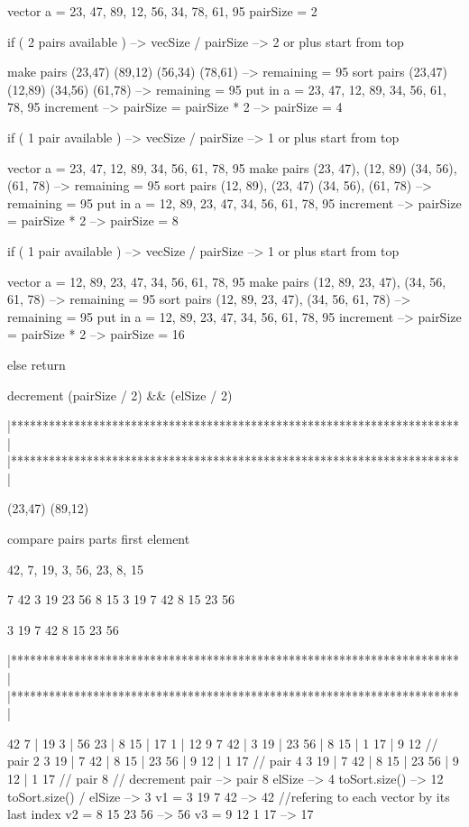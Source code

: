 vector a = {23, 47, 89, 12, 56, 34, 78, 61, 95}
pairSize = 2

if ( 2 pairs available ) --> vecSize / pairSize --> 2 or plus
    start from top

make pairs (23,47) (89,12) (56,34) (78,61) --> remaining = 95
sort pairs (23,47) (12,89) (34,56) (61,78) --> remaining = 95
put in a = {23, 47, 12, 89, 34, 56, 61, 78, 95}
increment --> pairSize = pairSize * 2 --> pairSize = 4

if ( 1 pair available ) --> vecSize / pairSize --> 1 or plus
    start from top

vector a = {23, 47, 12, 89, 34, 56, 61, 78, 95}
make pairs {(23, 47), (12, 89)} {(34, 56), (61, 78)} --> remaining = 95
sort pairs {(12, 89), (23, 47)} {(34, 56), (61, 78)} --> remaining = 95
put in a = {12, 89, 23, 47, 34, 56, 61, 78, 95}
increment --> pairSize = pairSize * 2 --> pairSize = 8

if ( 1 pair available ) --> vecSize / pairSize --> 1 or plus
    start from top

vector a = {12, 89, 23, 47, 34, 56, 61, 78, 95}
make pairs {(12, 89, 23, 47), (34, 56, 61, 78)} --> remaining = 95
sort pairs {(12, 89, 23, 47), (34, 56, 61, 78)} --> remaining = 95
put in a = {12, 89, 23, 47, 34, 56, 61, 78, 95}
increment --> pairSize = pairSize * 2 --> pairSize = 16

else 
    return

decrement (pairSize / 2) && (elSize / 2)

|***********************************************************************|
|***********************************************************************|


(23,47) (89,12)

compare pairs parts first element


42, 7, 19, 3, 56, 23, 8, 15

7 42      3 19    23 56      8 15
3 19   7 42       8 15     23  56

3 19 7 42 8 15 23 56


|***********************************************************************|
|***********************************************************************|

42 7 | 19 3 | 56 23 | 8 15 | 17 1 | 12 9
7 42 | 3 19 | 23 56 | 8 15 | 1 17 | 9 12 // pair 2
3 19 | 7 42 | 8 15 | 23 56 | 9 12 | 1 17 // pair 4
3 19 | 7 42 | 8 15 | 23 56 | 9 12 | 1 17 // pair 8
// %
decrement pair --> pair 8
elSize --> 4
toSort.size() --> 12
toSort.size() / elSize --> 3
v1 = {3 19 7 42} --> 42  //refering to each vector by its last index
v2 = {8 15 23 56} --> 56
v3 = {9 12 1 17} --> 17

